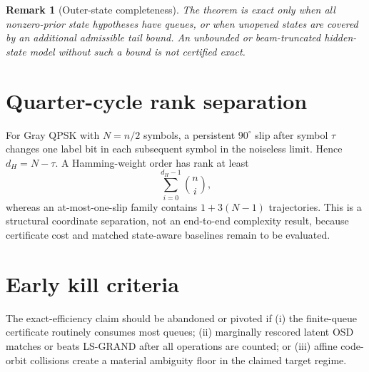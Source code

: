 \documentclass[11pt]{article}
\newtheorem{remark}{Remark}
\begin{document}
\begin{remark}[Outer-state completeness]
The theorem is exact only when all nonzero-prior state hypotheses have queues, or
when unopened states are covered by an additional admissible tail bound.  An
unbounded or beam-truncated hidden-state model without such a bound is not
certified exact.
\end{remark}

\section{Quarter-cycle rank separation}
For Gray QPSK with $N=n/2$ symbols, a persistent $90^\circ$ slip after symbol
$\tau$ changes one label bit in each subsequent symbol in the noiseless limit.
Hence $d_H=N-\tau$.  A Hamming-weight order has rank at least
\begin{equation}
 \sum_{i=0}^{d_H-1}\binom{n}{i},
\end{equation}
whereas an at-most-one-slip family contains $1+3(N-1)$ trajectories.  This is a
structural coordinate separation, not an end-to-end complexity result, because
certificate cost and matched state-aware baselines remain to be evaluated.

\section{Early kill criteria}
The exact-efficiency claim should be abandoned or pivoted if (i) the finite-queue
certificate routinely consumes most queues; (ii) marginally rescored latent OSD
matches or beats LS-GRAND after all operations are counted; or (iii) affine
code-orbit collisions create a material ambiguity floor in the claimed target
regime.
\end{document}
